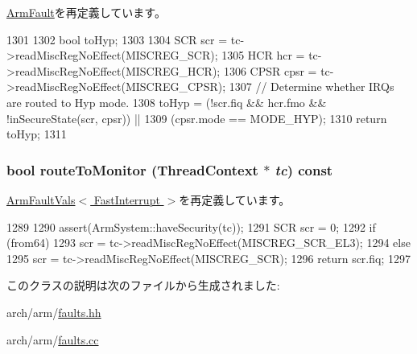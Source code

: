 \hyperlink{classArmISA_1_1ArmFault_a6fa7b734487c2a8da04a28ace414a355}{ArmFault}を再定義しています。


\begin{DoxyCode}
1301 {
1302     bool toHyp;
1303 
1304     SCR  scr  = tc->readMiscRegNoEffect(MISCREG_SCR);
1305     HCR  hcr  = tc->readMiscRegNoEffect(MISCREG_HCR);
1306     CPSR cpsr = tc->readMiscRegNoEffect(MISCREG_CPSR);
1307     // Determine whether IRQs are routed to Hyp mode.
1308     toHyp = (!scr.fiq && hcr.fmo && !inSecureState(scr, cpsr)) ||
1309             (cpsr.mode == MODE_HYP);
1310     return toHyp;
1311 }
\end{DoxyCode}
\hypertarget{classArmISA_1_1FastInterrupt_afd7a21fdb010230ad53094254739dde8}{
\subsubsection[{routeToMonitor}]{\setlength{\rightskip}{0pt plus 5cm}bool routeToMonitor ({\bf ThreadContext} $\ast$ {\em tc}) const}}
\label{classArmISA_1_1FastInterrupt_afd7a21fdb010230ad53094254739dde8}


\hyperlink{classArmISA_1_1ArmFaultVals_a9a0a467b98f43890c1d89d1d59a5923c}{ArmFaultVals$<$ FastInterrupt $>$}を再定義しています。


\begin{DoxyCode}
1289 {
1290     assert(ArmSystem::haveSecurity(tc));
1291     SCR scr = 0;
1292     if (from64)
1293         scr = tc->readMiscRegNoEffect(MISCREG_SCR_EL3);
1294     else
1295         scr = tc->readMiscRegNoEffect(MISCREG_SCR);
1296     return scr.fiq;
1297 }
\end{DoxyCode}


このクラスの説明は次のファイルから生成されました:\begin{DoxyCompactItemize}
\item 
arch/arm/\hyperlink{arch_2arm_2faults_8hh}{faults.hh}\item 
arch/arm/\hyperlink{arch_2arm_2faults_8cc}{faults.cc}\end{DoxyCompactItemize}
